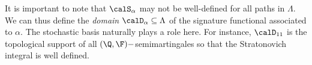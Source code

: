 It is important to note that  $\calS_{\alpha}$ may not be well-defined for all paths in $\Lambda$. We can thus define the \textit{domain} $\calD_{\alpha} \subseteq \Lambda$ of the signature functional associated to $\alpha$. The stochastic basis  naturally plays a role here. For instance, $\calD_{11}$ is the topological support of all $(\Q,\F)-$semimartingales so that the Stratonovich integral is well defined. 






